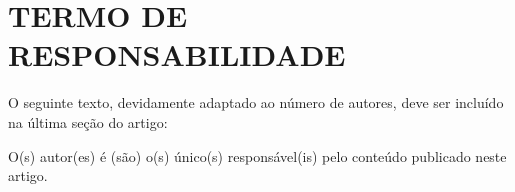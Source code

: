 \documentclass[10pt,fleqn,a4paper,twoside]{article}
\begin{document}
	
	\renewcommand{\refname}{}
	
	
	\section{TERMO DE RESPONSABILIDADE}
	
	O seguinte texto, devidamente adaptado ao número de autores, deve ser incluído na última seção do artigo:
	
	O(s) autor(es) é (são) o(s) único(s) responsável(is) pelo conteúdo publicado neste artigo.
	
\end{document}
